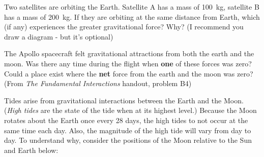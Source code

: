 \documentclass[addpoints,12pt]{exam}
\begin{document}
\begin{questions}
\question[4] 
	
	\question[4]
	Two satellites are orbiting the Earth. Satellite A has a mass of 100~kg, satellite B has a mass of 200~kg. If they are orbiting at the same distance from Earth, which (if any) experiences the greater gravitational force? Why? (I recommend you draw a diagram - but it's optional)
		\vspace{1.5in}
		
	\question[4]
	The Apollo spacecraft felt gravitational attractions from both the earth and the moon. Was there any time during the flight when \textbf{one} of these forces was zero? Could a place exist where the \textbf{net} force from the earth and the moon was zero? (From \textit{The Fundamental Interactions} handout, problem B4)
		\vspace{1.5in}
	 
	\clearpage
\question[6]
	Tides arise from gravitational interactions between the Earth and the Moon. (\textit{High tides} are the state of the tide when at its highest level.) Because the Moon rotates about the Earth once every 28 days, the high tides to not occur at the same time each day. Also, the magnitude of the high tide will vary from day to day. To understand why, consider the positions of the Moon relative to the Sun and Earth below:
	\begin{center}
	
	\end{center}
\end{questions}
\end{document}

